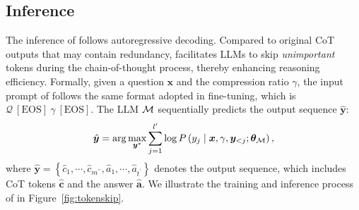 \subsection{Inference}
\label{sec:inference}
The inference of \method follows autoregressive decoding. Compared to original CoT outputs that may contain redundancy, \method facilitates LLMs to skip \textit{unimportant} tokens during the chain-of-thought process, thereby enhancing reasoning efficiency. Formally, given a question $\boldsymbol{x}$ and the compression ratio $\gamma$, the input prompt of \method follows the same format adopted in fine-tuning, which is $\mathcal{Q} \ \mathrm{[EOS]} \ \gamma \ \mathrm{[EOS]}$. The LLM $\mathcal{M}$ sequentially predicts the output sequence $\hat{\bm{y}}$:
\begin{equation}
\nonumber
\hat{\boldsymbol{y}}=\arg \max _{\boldsymbol{y}^*} \sum_{j=1}^{l^{\prime}} \log P\left(y_j \mid \boldsymbol{x}, \gamma, \boldsymbol{y}_{<j}; \bm{\theta}_{\mathcal{M}}\right),
\end{equation}
where $\hat{\bm{y}} =\left\{\hat{c}_1, \cdots,\hat{c}_{m^{\prime\prime}}, \hat{a}_1, \cdots, \hat{a}_{t^{\prime}}  \right\}$ denotes the output sequence, which includes CoT tokens $\hat{\bm{c}}$ and the answer $\bm{\hat{a}}$. We illustrate the training and inference process of \method in Figure~\ref{fig:tokenskip}. 
